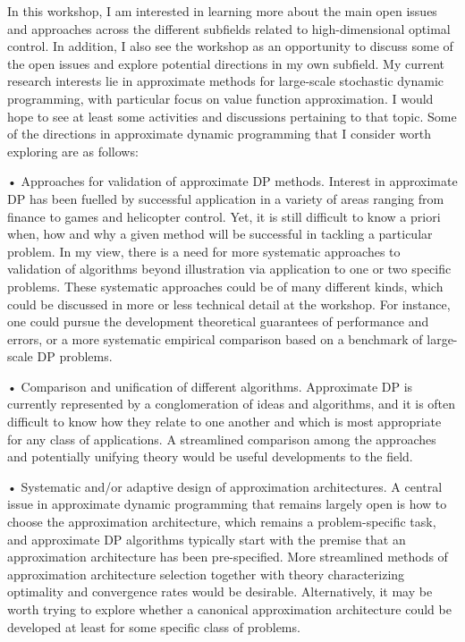 \documentclass[11pt]{article}
\begin{document}
In this workshop, I am interested in learning more about the main open issues and approaches across the different subfields related to high-dimensional optimal control. In addition, I also see the workshop as an opportunity to discuss some of the open issues and explore potential directions in my own subfield. My current research interests lie in approximate methods for large-scale stochastic dynamic programming, with particular focus on value function approximation. I would hope to see at least some activities and discussions pertaining to that topic. Some of the directions in approximate dynamic programming that I consider worth exploring are as follows:

• Approaches for validation of approximate DP methods. Interest in approximate DP has been fuelled by successful application in a variety of areas ranging from finance to games and helicopter control. Yet, it is still difficult to know a priori when, how and why a given method will be successful in tackling a particular problem. In my view, there is a need for more systematic approaches to validation of algorithms beyond illustration via application to one or two specific problems. These systematic approaches could be of many different kinds, which could be discussed in more or less technical detail at the workshop. For instance, one could pursue the development theoretical guarantees of performance and errors, or a more systematic empirical comparison based on a benchmark of large-scale DP problems.

• Comparison and unification of different algorithms. Approximate DP is currently represented by a conglomeration of ideas and algorithms, and it is often difficult to know how they relate to one another and which is most appropriate for any class of applications. A streamlined comparison among the approaches and potentially unifying theory would be useful developments to the field.

• Systematic and/or adaptive design of approximation architectures. A central issue in approximate dynamic programming that remains largely open is how to choose the approximation architecture, which remains a problem-specific task, and approximate DP algorithms typically start with the premise that an approximation architecture has been pre-specified. More streamlined methods of approximation architecture selection together with theory characterizing optimality and convergence rates would be desirable. Alternatively, it may be worth trying to explore whether a canonical approximation architecture could be developed at least for some specific class of problems.
\end{document}
